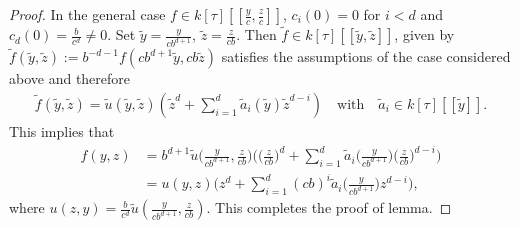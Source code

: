 \documentclass[10pt,a4paper]{amsart}
\newcommand{\h}{{h}}
\newcommand{\kk}{{k}}
\newcommand{\my}{\mathfrak m}
\begin{document}
\begin{proof}
In the general case  $f \in \kk[\tau] [[\frac y c, \frac z c]]$, $c_i(0)=0$ for $i<d $ and $c_d(0)= \frac b {c^ d} \ne 0 $.  
Set $\tilde y = \frac y {cb^{d+1}}$, $\tilde z = \frac z {cb}$.  Then $\tilde f \in \kk[\tau] [[\tilde y, \tilde z]]$, 
given by $\tilde f (\tilde y, \tilde z) := b ^ {-d-1} f(cb^{d+1}\tilde y, cb \tilde z)$ satisfies the assumptions of the case 
considered above and therefore 
\begin{align*}
\tilde f (\tilde y, \tilde z)   = \tilde u (\tilde y, \tilde z) (\tilde z^d  + \sum_{i=1}^{d} \tilde a_i (\tilde y) \tilde z^ {d-i})    \quad \text {with} \quad \tilde a_i \in 
\kk[\tau] [[\tilde y]]. 
\end{align*} 
This implies that 
\begin{align*}
 f (y, z)   & = b^{d+1}\tilde u \big (\frac y {cb^{d+1}}, \frac z {cb} \big ) \Big ( \big(\frac z {cb}\big )^d  + \sum_{i=1}^{d} \tilde a_i \big (\frac y {cb^{d+1}}\big ) \big (\frac z {cb}\big )^ {d-i} \Big)\\
 & = u(y,z) \Big (z^d  + \sum_{i=1}^{d} (cb)^i \tilde a_i \big (\frac y {cb^{d+1}}\big ) z ^ {d-i} \Big ), 
\end{align*} 
where $u(z,y) = \frac b {c^d}  \tilde u (\frac y {cb^{d+1}}, \frac z {cb}) $.  This completes the proof of lemma.    
\end{proof}
\end{document}
